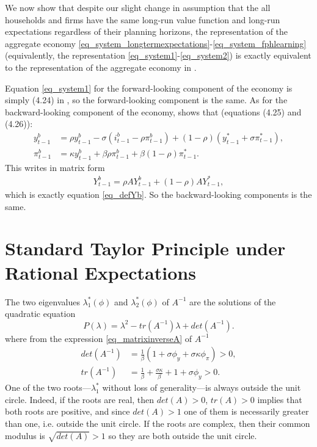We now show that despite our slight change in assumption that the all households and firms have the same long-run value function and long-run expectations regardless of their planning horizons, the representation of the aggregate economy \eqref{eq_system_longtermexpectations}-\eqref{eq_system_fphlearning} (equivalently, the representation \eqref{eq_system1}-\eqref{eq_system2}) is exactly equivalent to the representation of the aggregate economy in \cite{Woodford2019}.

Equation \eqref{eq_system1} for the forward-looking component of the economy is simply (4.24) in \cite{Woodford2019}, so the forward-looking component is the same. As for the backward-looking component of the economy, \cite{Woodford2019} shows that (equations (4.25) and (4.26)):
\begin{align}
y_{t-1}^b &= \rho y_{t-1}^b - \sigma (i_{t-1}^b-\rho \pi_{t-1}^b) + (1-\rho) (y_{t-1}^*+\sigma \pi_{t-1}^*),\\
\pi_{t-1}^b &= \kappa y_{t-1}^b + \beta \rho \pi_{t-1}^b + \beta (1-\rho) \pi_{t-1}^*.
\end{align}
This writes in matrix form
\begin{align}
Y_{t-1}^b = \rho A Y_{t-1}^b + (1-\rho) A Y_{t-1}^*, 
\end{align}
which is exactly equation \eqref{eq_defYb}. So the backward-looking components is the same.


\section{Standard Taylor Principle under Rational Expectations}\label{appendix_taylor_re}

The two eigenvalues $\lambda^*_1(\phi)$ and $\lambda^*_2(\phi)$ of $A^{-1}$ are the solutions of the quadratic equation
\begin{equation}
P(\lambda) = \lambda^2 -tr(A^{-1}) \lambda +det(A^{-1}).
\end{equation}
where from the expression \eqref{eq_matrixinverseA} of $A^{-1}$
\begin{align}
det(A^{-1}) &= \frac{1}{\beta}(1+\sigma \phi_y + \sigma \kappa \phi_{\pi}) >0,\label{eq_det}\\
tr(A^{-1}) &= \frac{1}{\beta}+\frac{\sigma \kappa}{\beta} +1+\sigma \phi_y>0.\label{eq_tr}
\end{align}
One of the two roots---$\lambda_1^*$ without loss of generality---is always outside the unit circle. Indeed, if the roots are real, then $det(A)>0$, $tr(A)>0$ implies that both roots are positive, and since $det(A)>1$ one of them is necessarily greater than one, i.e. outside the unit circle. If the roots are complex, then their common modulus is $\sqrt{det(A)}>1$ so they are both outside the unit circle.

